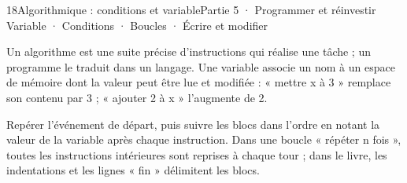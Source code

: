 \begin{ouverture}[algorithmique]{18}{Algorithmique : conditions et variable}{Partie 5 · Programmer et réinvestir}
{Variable · Conditions · Boucles · Écrire et modifier}
\end{ouverture}
\pagestyle{otMain}\essentiel\fontsize{11}{15}\selectfont
{}\label{cours-18-1}
\begin{definition}Un algorithme est une suite précise d’instructions qui réalise une tâche ; un programme le traduit dans un langage. Une variable associe un nom à un espace de mémoire dont la valeur peut être lue et modifiée : « mettre x à 3 » remplace son contenu par 3 ; « ajouter 2 à x » l’augmente de 2.\end{definition}
\begin{savoirfaire}Repérer l’événement de départ, puis suivre les blocs dans l’ordre en notant la valeur de la variable après chaque instruction. Dans une boucle « répéter n fois », toutes les instructions intérieures sont reprises à chaque tour ; dans le livre, les indentations et les lignes « fin » délimitent les blocs.\end{savoirfaire}
\label{fig-cours-18-1-script-01}

